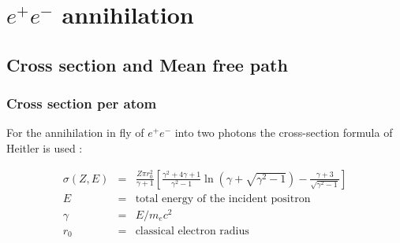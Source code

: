 
\chapter[$e^+ e^-$ annihilation]{$e^+ e^-$ annihilation}
\section{Cross section and Mean free path}
\subsection{Cross section per atom}
For the annihilation in fly of $e^+ e^-$ into two photons 
the cross-section formula of Heitler is used \cite{heitler,egs4}: 

\begin{eqnarray*}
\sigma(Z,E) & = & \frac{Z \pi r^2_0}{\gamma +1}
                  \left[\frac{\gamma^2 + 4 \gamma +1}{\gamma^2 -1}
                  \ln \left(\gamma +\sqrt{\gamma^2 -1} \right)  -\frac
                  {\gamma +3}{\sqrt{\gamma^2 -1}} \right]  \\
E      & = & \mbox{total energy of the incident positron} \\
\gamma & = & E/m_e c^2 \\
r_0    & = & \mbox{classical electron radius}      
\end{eqnarray*}

